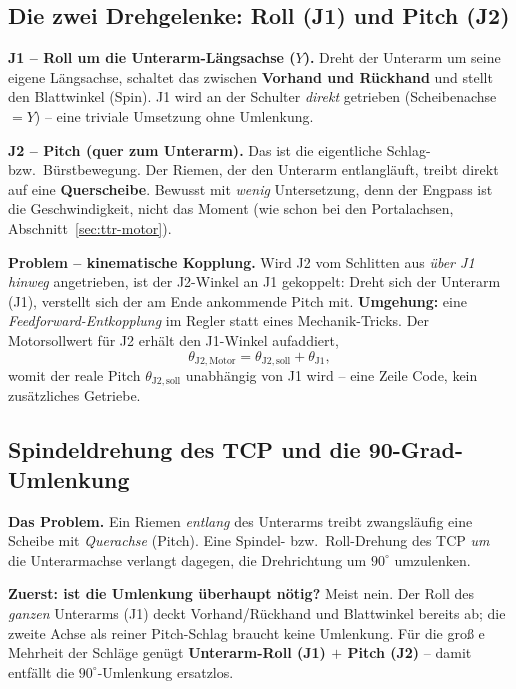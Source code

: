 \subsection{Die zwei Drehgelenke: Roll (J1) und Pitch (J2)}
\label{sec:ttr-arm-gelenke}

\textbf{J1 -- Roll um die Unterarm-L\"angsachse ($Y$).} Dreht der Unterarm um
seine eigene L\"angsachse, schaltet das zwischen \textbf{Vorhand und R\"uckhand}
und stellt den Blattwinkel (Spin). J1 wird an der Schulter \emph{direkt} getrieben
(Scheibenachse $=Y$) -- eine triviale Umsetzung ohne Umlenkung.

\textbf{J2 -- Pitch (quer zum Unterarm).} Das ist die eigentliche Schlag- bzw.\
B\"urstbewegung. Der Riemen, der den Unterarm entlangl\"auft, treibt direkt auf
eine \textbf{Querscheibe}. Bewusst mit \emph{wenig} Untersetzung, denn der Engpass
ist die Geschwindigkeit, nicht das Moment (wie schon bei den Portalachsen,
Abschnitt~\ref{sec:ttr-motor}).

\textbf{Problem -- kinematische Kopplung.} Wird J2 vom Schlitten aus \emph{\"uber
J1 hinweg} angetrieben, ist der J2-Winkel an J1 gekoppelt: Dreht sich der Unterarm
(J1), verstellt sich der am Ende ankommende Pitch mit. \textbf{Umgehung:} eine
\emph{Feedforward-Entkopplung} im Regler statt eines Mechanik-Tricks. Der
Motorsollwert f\"ur J2 erh\"alt den J1-Winkel aufaddiert,
\begin{equation}
\theta_{\mathrm{J2,Motor}} = \theta_{\mathrm{J2,soll}} + \theta_{\mathrm{J1}},
\label{eq:ttr-arm-decouple}
\end{equation}
womit der reale Pitch $\theta_{\mathrm{J2,soll}}$ unabh\"angig von J1 wird -- eine
Zeile Code, kein zus\"atzliches Getriebe.

\subsection{Spindeldrehung des TCP und die 90-Grad-Umlenkung}
\label{sec:ttr-arm-umlenkung}

\textbf{Das Problem.} Ein Riemen \emph{entlang} des Unterarms treibt zwangsl\"aufig
eine Scheibe mit \emph{Querachse} (Pitch). Eine Spindel- bzw.\ Roll-Drehung des
TCP \emph{um} die Unterarmachse verlangt dagegen, die Drehrichtung um
\textbf{$90^\circ$} umzulenken.

\textbf{Zuerst: ist die Umlenkung \"uberhaupt n\"otig?} Meist nein. Der Roll des
\emph{ganzen} Unterarms (J1) deckt Vorhand/R\"uckhand und Blattwinkel bereits ab;
die zweite Achse als reiner Pitch-Schlag braucht keine Umlenkung. F\"ur die gro\ss
e Mehrheit der Schl\"age gen\"ugt \textbf{Unterarm-Roll (J1) $+$ Pitch (J2)} --
damit entf\"allt die $90^\circ$-Umlenkung ersatzlos.

